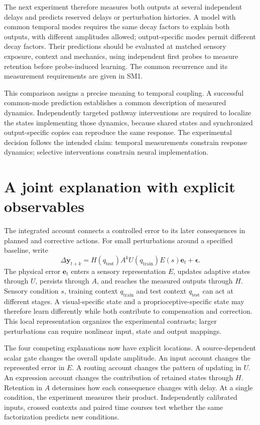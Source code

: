 \documentclass[11pt,a4paper]{article}
\begin{document}
The next experiment therefore measures both outputs at several independent delays and predicts reserved delays or perturbation histories. A model with common temporal modes requires the same decay factors to explain both outputs, with different amplitudes allowed; output-specific modes permit different decay factors. Their predictions should be evaluated at matched sensory exposure, context and mechanics, using independent first probes to measure retention before probe-induced learning. The common recurrence and its measurement requirements are given in SM1. \cite{unlearning2016}

This comparison assigns a precise meaning to temporal coupling. A successful common-mode prediction establishes a common description of measured dynamics. Independently targeted pathway interventions are required to localize the states implementing those dynamics, because shared states and synchronized output-specific copies can reproduce the same response. The experimental decision follows the intended claim: temporal measurements constrain response dynamics; selective interventions constrain neural implementation.

\section{A joint explanation with explicit observables}
The integrated account connects a controlled error to its later consequences in planned and corrective actions. For small perturbations around a specified baseline, write
\begin{equation}\Delta\mathbf y_{t+k}=H(q_{\mathrm{test}})A^kU(q_{\mathrm{train}})E(s)\mathbf e_t+\boldsymbol\epsilon.\label{eq:factor}\end{equation}
The physical error $\mathbf e_t$ enters a sensory representation $E$, updates adaptive states through $U$, persists through $A$, and reaches the measured outputs through $H$. Sensory condition $s$, training context $q_{\mathrm{train}}$ and test context $q_{\mathrm{test}}$ can act at different stages. A visual-specific state and a proprioceptive-specific state may therefore learn differently while both contribute to compensation and correction. This local representation organizes the experimental contrasts; larger perturbations can require nonlinear input, state and output mappings.

The four competing explanations now have explicit locations. A source-dependent scalar gate changes the overall update amplitude. An input account changes the represented error in $E$. A routing account changes the pattern of updating in $U$. An expression account changes the contribution of retained states through $H$. Retention in $A$ determines how each consequence changes with delay. At a single condition, the experiment measures their product. Independently calibrated inputs, crossed contexts and paired time courses test whether the same factorization predicts new conditions.
\end{document}

